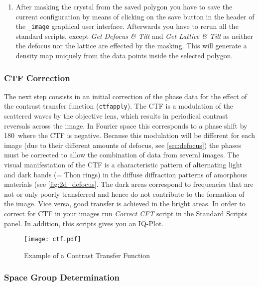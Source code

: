 \begin{enumerate}
	\item After masking the crystal from the saved polygon you have to save the current configuration by means of clicking on the save button in the header of the {\twodx}\texttt{\_image} graphical user interface. Afterwards you have to rerun all the standard scripts, except \textit{Get Defocus \& Tilt} and  \textit{Get Lattice \& Tilt} as neither the defocus nor the lattice are effected by the masking. This will generate a density map uniquely from the data points inside the selected polygon.
	
\end{enumerate}



\subsubsection{CTF Correction}
\label{sec:ctf}

The next step consists in an initial correction of the phase data for the effect of the contrast transfer function (\texttt{ctfapply}). The CTF is a modulation of the scattered waves by the objective lens, which results in periodical contrast reversals across the image. In Fourier space this corresponds to a phase shift by 180\textdegree~where the CTF is negative. Because this modulation will be different for each image (due to their different amounts of defocus, see \autoref{sec:defocus}) the phases must be corrected to allow the combination of data from several images. The visual manifestation of the CTF is a characteristic pattern of alternating light and dark bands (= Thon rings) in the diffuse diffraction patterns of amorphous materials (see \autoref{fig:2d_defocus}. The dark areas correspond to frequencies that are not or only poorly transferred and hence do not contribute to the formation of the image. Vice versa, good transfer is achieved in the bright areas. 
In order to correct for CTF in your images run \textit{Correct CFT} script in the Standard Scripts panel. In addition, this scripts gives you an IQ-Plot. 

	\begin{figure}[H]
		\centering
		\texttt{[image: ctf.pdf]}
		\caption{Example of a Contrast Transfer Function}
		\label{fig:ctf}
	\end{figure}
	
\newpage

\subsubsection{Space Group Determination}	
\label{sec:space_group}

